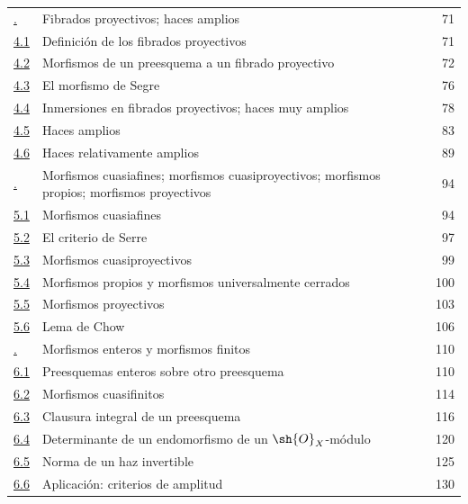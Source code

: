 \documentclass[oneside,10pt]{amsart}
\begin{document}
\begin{longtable}{@{}p{}p{}r@{}}
\hyperref[section:II.4]{\textsection4.} & Fibrados proyectivos; haces amplios & 71\\
\hyperref[subsection:II.4.1]{4.1} & Definición de los fibrados proyectivos & 71\\
\hyperref[subsection:II.4.2]{4.2} & Morfismos de un preesquema a un fibrado proyectivo & 72\\
\hyperref[subsection:II.4.3]{4.3} & El morfismo de Segre & 76\\
\hyperref[subsection:II.4.4]{4.4} & Inmersiones en fibrados proyectivos; haces muy amplios & 78\\
\hyperref[subsection:II.4.5]{4.5} & Haces amplios & 83\\
\hyperref[subsection:II.4.6]{4.6} & Haces relativamente amplios & 89\\
\hyperref[section:II.5]{\textsection5.} & Morfismos cuasiafines; morfismos cuasiproyectivos; morfismos propios; morfismos proyectivos & 94\\
\hyperref[subsection:II.5.1]{5.1} & Morfismos cuasiafines & 94\\
\hyperref[subsection:II.5.2]{5.2} & El criterio de Serre & 97\\
\hyperref[subsection:II.5.3]{5.3} & Morfismos cuasiproyectivos & 99\\
\hyperref[subsection:II.5.4]{5.4} & Morfismos propios y morfismos universalmente cerrados & 100\\
\hyperref[subsection:II.5.5]{5.5} & Morfismos proyectivos & 103\\
\hyperref[subsection:II.5.6]{5.6} & Lema de Chow & 106\\
\hyperref[section:II.6]{\textsection6.} & Morfismos enteros y morfismos finitos & 110\\
\hyperref[subsection:II.6.1]{6.1} & Preesquemas enteros sobre otro preesquema & 110\\
\hyperref[subsection:II.6.2]{6.2} & Morfismos cuasifinitos & 114\\
\hyperref[subsection:II.6.3]{6.3} & Clausura integral de un preesquema & 116\\
\hyperref[subsection:II.6.4]{6.4} & Determinante de un endomorfismo de un $\sh{O}_X$-módulo & 120\\
\hyperref[subsection:II.6.5]{6.5} & Norma de un haz invertible & 125\\
\hyperref[subsection:II.6.6]{6.6} & Aplicación: criterios de amplitud & 130\\

\end{longtable}
\end{document}

